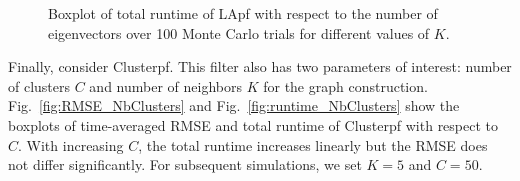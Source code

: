 \documentclass[10pt,letterpaper,final]{article}
\begin{document}
\begin{figure}
\centering
{}
\caption{Boxplot of total runtime of LApf with respect to the number of eigenvectors over 100 Monte Carlo trials for different values of $K$.}
\label{fig:runtime_NbEigen}
\end{figure}

Finally, consider Clusterpf. This filter also has two parameters of interest: number of clusters $C$ and number of neighbors $K$ for the graph construction. Fig.~\ref{fig:RMSE_NbClusters} and Fig.~\ref{fig:runtime_NbClusters} show the boxplots of time-averaged RMSE and total runtime of Clusterpf with respect to $C$. With increasing $C$, the total runtime increases linearly but the RMSE does not differ significantly. For subsequent simulations, we set $K=5$ and $C=50$. 
\end{document}
